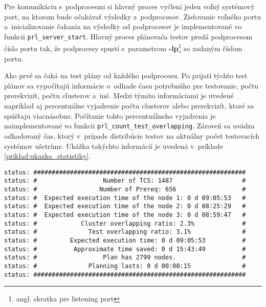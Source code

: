 Pre komunikáciu s~podprocesmi si hlavný proces vyčlení jeden voľný 
systémový port, na ktorom bude očakávať výsledky z~podprocesov. 
Zisťovanie voľného portu a~inicializovanie čakania na výsledky od 
podprocesov je implementované vo funkcii \texttt{prl\_server\_start}. 
Hlavný proces plánovača testov predá podprocesom číslo portu tak, že 
podprocesy spustí s~parametrom 
\textbf{-lp}\footnote{angl. skratka pre listening port} so zadaným
číslom portu.

Ako prvé sa čaká na test plány od každého podprocesu. 
Po prijatí týchto test plánov sa vypočítajú informácie
o~odhade času potrebnúho pre testovanie, počtu prerekvizít, počtu clusterov a~iné.
Medzi týmito informáciami je uvedené napríklad aj percentuálne vyjadrenie 
počtu clusterov alebo prerekvizít, ktoré sa spúšťaju viacnásobne. 
Počítanie tohto percentuálneho vyjadrenia 
je naimplementované vo funkcii \texttt{prl\_count\_test\_overlapping}.
Zároveň sa uvádza odhadovaný čas, ktorý v~prípade distribúcie testov
na aktuálny počet testovacích systémov ušetríme. 
Ukážka takýchto informácií je uvedená v~príklade \ref{priklad:ukazka_statistiky}.

\begin{lstlisting}[caption=Informácie zobrazované pred spustením regresných testoch,
label=priklad:ukazka_statistiky]
status: ##########################################################
status: #                  Number of TCS: 1487                   #
status: #                 Number of Prereq: 656                  #
status: #  Expected execution time of the node 1: 0 d 09:05:53   #
status: #  Expected execution time of the node 2: 0 d 08:25:29   #
status: #  Expected execution time of the node 3: 0 d 08:59:47   #
status: #            Cluster overlapping ratio: 2.3%             #
status: #              Test overlapping ratio: 3.1%              #
status: #         Expected execution time: 0 d 09:05:53          #
status: #          Approximate time saved: 0 d 15:43:49          #
status: #                  Plan has 2799 nodes.                  #
status: #              Planning lasts: 0 d 00:00:15              #
status: ##########################################################
\end{lstlisting}

